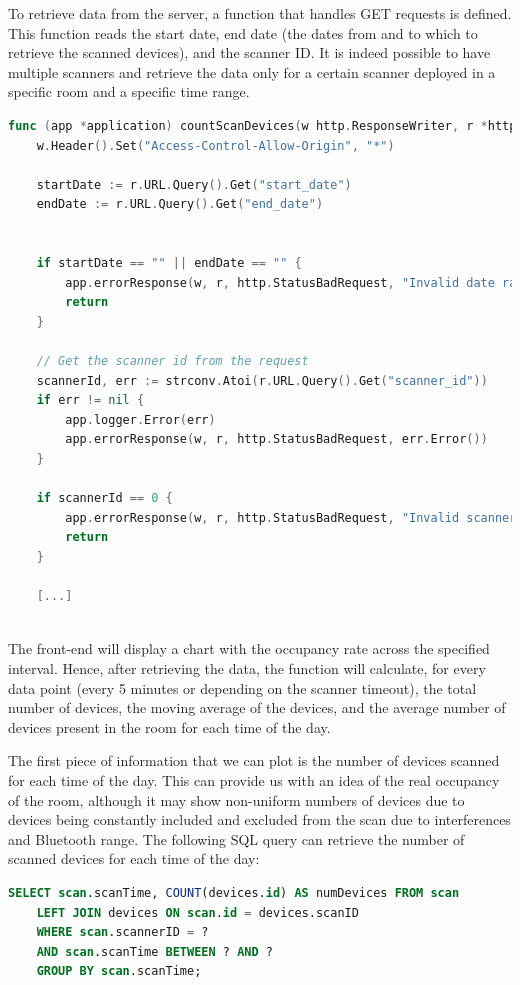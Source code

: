 \documentclass[a4paper, 11pt]{article}
\begin{document}
To retrieve data from the server, a function that handles GET requests is defined. This function reads the start date, end date (the dates from and to which to retrieve the scanned devices), and the scanner ID. It is indeed possible to have multiple scanners and retrieve the data only for a certain scanner deployed in a specific room and a specific time range.

\begin{lstlisting}[language=Go]
func (app *application) countScanDevices(w http.ResponseWriter, r *http.Request) {
	w.Header().Set("Access-Control-Allow-Origin", "*")

	startDate := r.URL.Query().Get("start_date")
	endDate := r.URL.Query().Get("end_date")


	if startDate == "" || endDate == "" {
		app.errorResponse(w, r, http.StatusBadRequest, "Invalid date range")
		return
	}

	// Get the scanner id from the request
	scannerId, err := strconv.Atoi(r.URL.Query().Get("scanner_id"))
	if err != nil {
		app.logger.Error(err)
		app.errorResponse(w, r, http.StatusBadRequest, err.Error())
	}

	if scannerId == 0 {
		app.errorResponse(w, r, http.StatusBadRequest, "Invalid scanner id")
		return
	}
	
	[...]
	
\end{lstlisting}

The front-end will display a chart with the occupancy rate across the specified interval. Hence, after retrieving the data, the function will calculate, for every data point (every 5 minutes or depending on the scanner timeout), the total number of devices, the moving average of the devices, and the average number of devices present in the room for each time of the day.

The first piece of information that we can plot is the number of devices scanned for each time of the day. This can provide us with an idea of the real occupancy of the room, although it may show non-uniform numbers of devices due to devices being constantly included and excluded from the scan due to interferences and Bluetooth range. The following SQL query can retrieve the number of scanned devices for each time of the day:

\begin{lstlisting}[language=SQL]
	SELECT scan.scanTime, COUNT(devices.id) AS numDevices FROM scan
	LEFT JOIN devices ON scan.id = devices.scanID
	WHERE scan.scannerID = ?
	AND scan.scanTime BETWEEN ? AND ?
	GROUP BY scan.scanTime;
\end{lstlisting}
\end{document}
